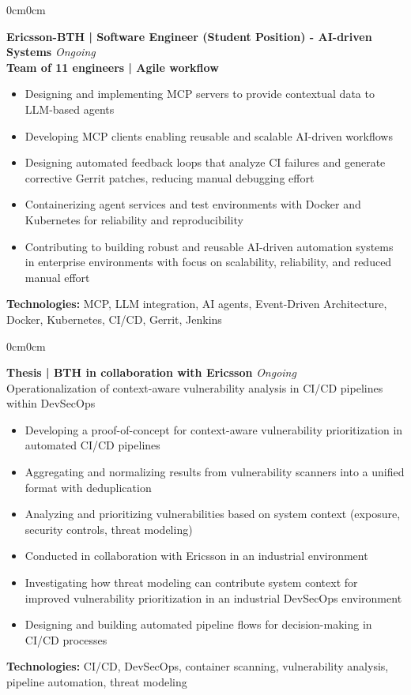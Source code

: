 \documentclass[10pt, letterpaper]{article}
\newenvironment{highlights}{
    \begin{itemize}[topsep=0.10cm, parsep=0.10cm, partopsep=0pt, itemsep=0pt, leftmargin=10pt]
}{
    \end{itemize}
}
\newenvironment{onecolentry}{
    \begin{adjustwidth}{0cm}{0cm}
}{
    \end{adjustwidth}
}
\begin{document}
    \begin{onecolentry}
        \textbf{Ericsson-BTH | Software Engineer (Student Position) - AI-driven Systems} \hfill \textit{Ongoing}
        \\[0.15cm]
        \textbf{Team of 11 engineers | Agile workflow}
        \begin{highlights}
            \item Designing and implementing MCP servers to provide contextual data to LLM-based agents
            \item Developing MCP clients enabling reusable and scalable AI-driven workflows
            \item Designing automated feedback loops that analyze CI failures and generate corrective Gerrit patches, reducing manual debugging effort
            \item Containerizing agent services and test environments with Docker and Kubernetes for reliability and reproducibility
            \item Contributing to building robust and reusable AI-driven automation systems in enterprise environments with focus on scalability, reliability, and reduced manual effort
        \end{highlights}
        \textbf{Technologies:} MCP, LLM integration, AI agents, Event-Driven Architecture, Docker, Kubernetes, CI/CD, Gerrit, Jenkins
    \end{onecolentry}

    \vspace{0.3cm}

    \begin{onecolentry}
        \textbf{Thesis | BTH in collaboration with Ericsson} \hfill \textit{Ongoing} \\
        Operationalization of context-aware vulnerability analysis in CI/CD pipelines within DevSecOps
        \begin{highlights}
            \item Developing a proof-of-concept for context-aware vulnerability prioritization in automated CI/CD pipelines
            \item Aggregating and normalizing results from vulnerability scanners into a unified format with deduplication
            \item Analyzing and prioritizing vulnerabilities based on system context (exposure, security controls, threat modeling)
            \item Conducted in collaboration with Ericsson in an industrial environment
            \item Investigating how threat modeling can contribute system context for improved vulnerability prioritization in an industrial DevSecOps environment
            \item Designing and building automated pipeline flows for decision-making in CI/CD processes
        \end{highlights}
        \textbf{Technologies:} CI/CD, DevSecOps, container scanning, vulnerability analysis, pipeline automation, threat modeling
    \end{onecolentry}
\end{document}
